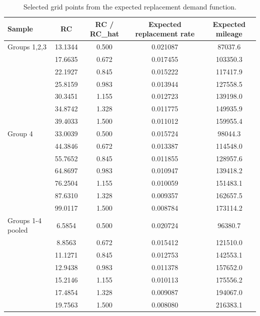 \begin{table}[htbp]
\centering
\caption{Selected grid points from the expected replacement demand function.}
\label{tab:rust\_expected\_replacement\_demand\_grid}
\begin{tabular}{lcccc}
\toprule
Sample & RC & RC / RC\_hat & Expected replacement rate & Expected mileage \\
\midrule
Groups 1,2,3 & 13.1344 & 0.500 & 0.021087 & 87037.6 \\
 & 17.6635 & 0.672 & 0.017455 & 103350.3 \\
 & 22.1927 & 0.845 & 0.015222 & 117417.9 \\
 & 25.8159 & 0.983 & 0.013944 & 127558.5 \\
 & 30.3451 & 1.155 & 0.012723 & 139198.0 \\
 & 34.8742 & 1.328 & 0.011775 & 149935.9 \\
 & 39.4033 & 1.500 & 0.011012 & 159955.4 \\
Group 4 & 33.0039 & 0.500 & 0.015724 & 98044.3 \\
 & 44.3846 & 0.672 & 0.013387 & 114548.0 \\
 & 55.7652 & 0.845 & 0.011855 & 128957.6 \\
 & 64.8697 & 0.983 & 0.010947 & 139418.2 \\
 & 76.2504 & 1.155 & 0.010059 & 151483.1 \\
 & 87.6310 & 1.328 & 0.009357 & 162657.5 \\
 & 99.0117 & 1.500 & 0.008784 & 173114.2 \\
Groups 1-4 pooled & 6.5854 & 0.500 & 0.020724 & 96380.7 \\
 & 8.8563 & 0.672 & 0.015412 & 121510.0 \\
 & 11.1271 & 0.845 & 0.012753 & 142553.1 \\
 & 12.9438 & 0.983 & 0.011378 & 157652.0 \\
 & 15.2146 & 1.155 & 0.010113 & 175556.2 \\
 & 17.4854 & 1.328 & 0.009087 & 194067.0 \\
 & 19.7563 & 1.500 & 0.008080 & 216383.1 \\
\bottomrule
\end{tabular}
\end{table}